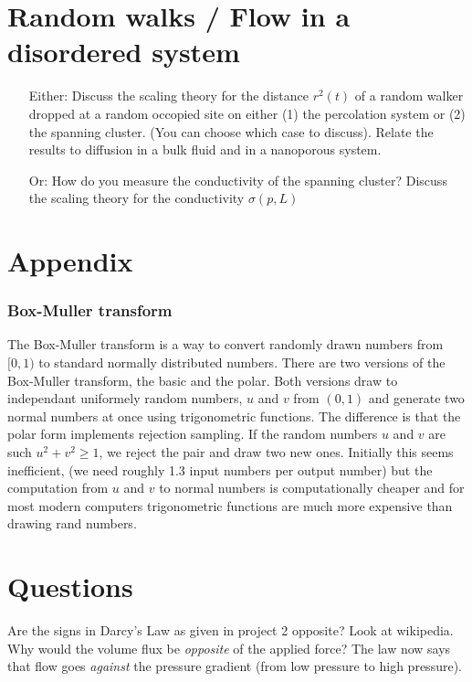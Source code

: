 \documentclass[a4paper, 11pt, notitlepage, english]{article}
\begin{document}
\clearpage

\section{ Random walks / Flow in a disordered system}
\begin{itemize}
	\item[Either:] Discuss the scaling theory for the distance $r^2(t)$ of a random walker
dropped at a random occopied site on either (1) the percolation system or (2)
the spanning cluster. (You can choose which case to discuss). Relate the results
to diffusion in a bulk fluid and in a nanoporous system.
\item[Or: ] How do you measure the conductivity of the spanning cluster? Discuss the
scaling theory for the conductivity $\sigma(p, L)$
\end{itemize}

\clearpage

\section*{Appendix}

\subsubsection*{Box-Muller transform}

The Box-Muller transform is a way to convert randomly drawn numbers from $[0,1)$ to standard normally distributed numbers. There are two versions of the Box-Muller transform, the basic and the polar. Both versions draw to independant uniformely random numbers, $u$ and $v$ from $(0,1)$ and generate two normal numbers at once using trigonometric functions. The difference is that the polar form implements rejection sampling. If the random numbers $u$ and $v$ are such $u^2 + v^2 \geq 1$, we reject the pair and draw two new ones. Initially this seems inefficient, (we need roughly 1.3 input numbers per output number) but the computation from $u$ and $v$ to normal numbers is computationally cheaper and for most modern computers trigonometric functions are much more expensive than drawing rand numbers.

\section*{Questions}

Are the signs in Darcy's Law as given in project 2 opposite? Look at wikipedia. Why would the volume flux be \emph{opposite} of the applied force? The law now says that flow goes \emph{against} the pressure gradient (from low pressure to high pressure).
\end{document}
